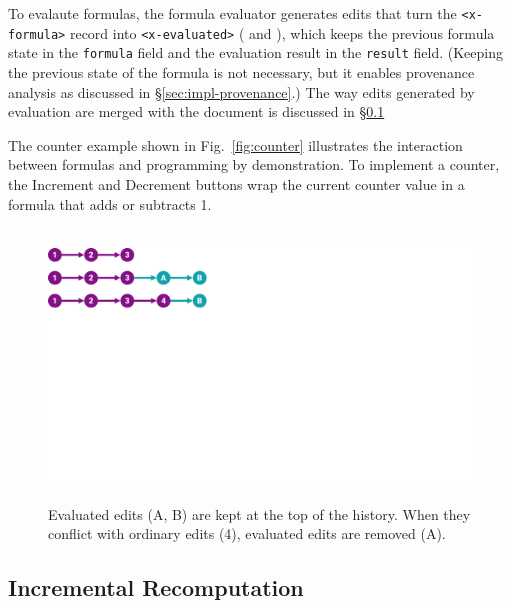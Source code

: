 \documentclass[sigconf,anonymous,screen]{acmart}
\newcommand*\circled[1]{\textnormal{\footnotesize\sffamily\bfseries\protect\tikz[baseline=(char.base)]{
  \node[shape=circle,fill=black,text=white,draw,inner sep=1pt] (char) {#1};}}}
\begin{document}
To evalaute formulas, the formula evaluator generates edits that turn the {\small\Verb_<x-formula>_}
record into {\small\Verb_<x-evaluated>_} (\circled{2} and \circled{3}), which keeps the previous
formula state in the {\small\Verb_formula_} field and the evaluation result in the {\small\Verb_result_} field.
(Keeping the previous state of the formula is not necessary, but it enables provenance analysis
as discussed in \S\ref{sec:impl-provenance}.) The way edits generated by evaluation are merged
with the document is discussed in \S\ref{sec:impl-incremental}

The counter example shown in Fig.~\ref{fig:counter} illustrates the interaction between formulas
and programming by demonstration. To implement a counter, the Increment and Decrement buttons
wrap the current counter value in a formula that adds or subtracts 1.

\begin{figure}[t]
\centering
\vspace{-0.5em}
\begin{minipage}{0.6\columnwidth}
  ~\\[1em]
  \includegraphics[width=0.9\columnwidth,clip,trim=0cm 14cm 21cm 0cm]{fig/eval.pdf}
  \end{minipage}%
  \begin{minipage}{0.4\columnwidth}
    \caption{Evaluated edits (A, B) are kept at the top of the history. When they conflict with
    ordinary edits (4), evaluated edits are removed (A).}
    \label{fig:eval}
  \end{minipage}
  \vspace{-1em}
\end{figure}

\subsection{Incremental Recomputation}
\label{sec:impl-incremental}
\end{document}
